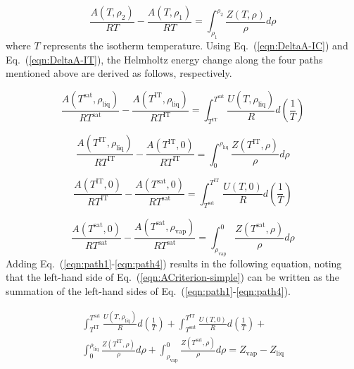\documentclass[5p,times]{elsarticle}
\begin{document}
\begin{equation}
\frac{A(T,\rho_2)}{RT} -  \frac{A(T,\rho_1)}{RT}  = \int _{\rho_1}^{\rho_2} \frac{Z(T,\rho)}{\rho}  d\rho
\label{eqn:DeltaA-IT}
\end{equation}
where $T$ represents the isotherm temperature. Using Eq.~(\ref{eqn:DeltaA-IC}) and Eq.~(\ref{eqn:DeltaA-IT}), the Helmholtz energy change along the four paths mentioned above are derived as follows, respectively.

\begin{equation}
\frac{A(T^\mathrm{sat},\rho_\mathrm{liq})}{RT^\mathrm{sat}}
-
\frac{A(T^\mathrm{IT},\rho_\mathrm{liq})}{RT^\mathrm{IT}}
=
\int _{T^\mathrm{IT}}^{T^\mathrm{sat}} \frac{U(T,\rho_\mathrm{liq})}{R}  d\left(\frac{1}{T}\right)
\label{eqn:path1}
\end{equation}


\begin{equation}
\frac{A(T^\mathrm{IT},\rho_\mathrm{liq})}{RT^\mathrm{IT}}
-
\frac{A(T^\mathrm{IT},0)}{RT^\mathrm{IT}}
=
\int _{0}^{\rho_\mathrm{liq}} \frac{Z(T^\mathrm{IT},\rho)}{\rho}  d\rho
\label{eqn:path2}
\end{equation}

\begin{equation}
\frac{A(T^\mathrm{IT},0)}{RT^\mathrm{IT}}
-
\frac{A(T^\mathrm{sat},0)}{RT^\mathrm{sat}}
=
\int _{T^\mathrm{sat}}^{T^\mathrm{IT}} \frac{U(T,0)}{R}  d\left(\frac{1}{T}\right)
\label{eqn:path3}
\end{equation}

\begin{equation}
\frac{A(T^\mathrm{sat},0)}{RT^\mathrm{sat}}
-
\frac{A(T^\mathrm{sat},\rho_\mathrm{vap})}{RT^\mathrm{sat}}
=
\int _{\rho_\mathrm{vap}}^{0} \frac{Z(T^\mathrm{sat},\rho)}{\rho}  d\rho
\label{eqn:path4}
\end{equation}
Adding Eq.~(\ref{eqn:path1}-\ref{eqn:path4}) results in the following equation, noting that the left-hand side of Eq.~(\ref{eqn:ACriterion-simple}) can be written as the summation of the left-hand sides of Eq.~(\ref{eqn:path1}-\ref{eqn:path4}). 

\begin{equation}
\begin{array}{l}
\int _{T^\mathrm{IT}}^{T^\mathrm{sat}} \frac{U(T,\rho_\mathrm{liq})}{R}  d\left(\frac{1}{T}\right)+
\int _{T^\mathrm{sat}}^{T^\mathrm{IT}} \frac{U(T,0)}{R}  d\left(\frac{1}{T}\right)+
\\
\int _{0}^{\rho_\mathrm{liq}} \frac{Z(T^\mathrm{IT},\rho)}{\rho}  d\rho + \int _{\rho_\mathrm{vap}}^{0} \frac{Z(T^\mathrm{sat},\rho)}{\rho}  d\rho=Z_\mathrm{vap} - Z_\mathrm{liq} 
\end{array}
\label{eqn:paths1-4}
\end{equation}
\end{document}

